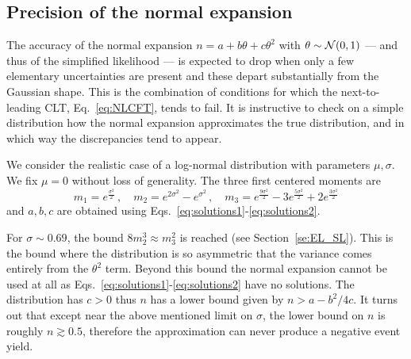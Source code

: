 \documentclass[11pt]{article}
\newcommand{\be}{\begin{equation}}
\newcommand{\ee}{\end{equation}}
\begin{document}
%








\subsection{Precision of the normal expansion}
\label{se:precision}

The accuracy of the normal expansion $n =  a+ b \theta+ c \theta^2$ with $\theta\sim {\cal N}(0,1)$ --- and thus of the  simplified likelihood --- is expected to drop when only a few elementary  uncertainties are present and these depart substantially from the Gaussian shape. This is the combination of conditions for which the
 next-to-leading CLT, Eq.~\eqref{eq:NLCFT}, tends to fail.  It is instructive to check  on a simple distribution how the normal expansion  approximates the true distribution, and in which way the discrepancies tend to appear.

We consider the realistic  case of     a log-normal distribution with parameters $\mu, \sigma$. We fix $\mu=0$ without loss of generality. The three first centered moments are
\be
m_1=e^{\frac{\sigma^2}{2}}\,,\quad m_2=e^{2\sigma^2}-e^{\sigma^2}\,,\quad
m_3=e^{\frac{9\sigma^2}{2}}-3 e^{\frac{5\sigma^2}{2}}+2 e^{\frac{3\sigma^2}{2}}
\ee
and  $a,b,c$ are obtained  using  Eqs.~\eqref{eq:solutions1}-\eqref{eq:solutions2}.

For $\sigma\sim 0.69$, the bound $8m_2^3\approx m_3^2$  is reached (see Section~\ref{se:EL_SL}). This is the bound where
the distribution is so asymmetric that the variance comes entirely from the $\theta^2$ term. Beyond this bound the  normal expansion cannot be used at all as Eqs.~\eqref{eq:solutions1}-\eqref{eq:solutions2} have no solutions.
 The distribution has $c>0$ thus $n$ has a lower bound given by $n>a-b^2/4c$. It turns out that except near the above mentioned limit on $\sigma$, the lower bound on $n$ is roughly $n\gtrsim 0.5$, therefore the approximation can never produce a negative event yield.
\end{document}

